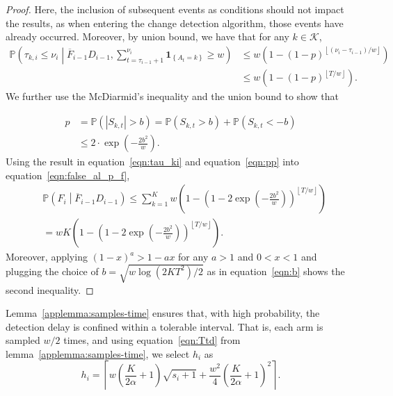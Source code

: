\documentclass[twoside]{article}
\def\eqref#1{equation~\ref{#1}}
\def\1{\bm{1}}
\def\gK{{\mathcal{K}}}
\theoremstyle{plain}
\theoremstyle{definition}
\theoremstyle{remark}
\begin{document}
\begin{proof}
    Here, the inclusion of subsequent events as conditions should not impact the results, as when entering the change detection algorithm, those events have already occurred.
    Moreover, by union bound, we have that for any $k\in\gK$,
    \begin{subequations}
        \begin{align}
            \mathbb{P}\left(\tau_{k,i}\leq \nu_{i}\middle|\overline{F}_{i-1}D_{i-1},\sum_{t=\tau_{i-1}+1}^{\nu_{i}}\1_{\left\{A_{t}=k\right\}}\geq w\right)&\leq w\left( 1-\left(1-p\right)^{\left\lfloor \left(\nu_{i}-\tau_{i-1}\right)/w \right\rfloor}  \right)\\ 
            &\leq w\left( 1-(1-p)^{\left\lfloor T/w \right\rfloor}  \right).  \label{eqn:tau_ki}
        \end{align}
    \end{subequations}
    We further use the McDiarmid's inequality and the union bound to show that

    \begin{subequations}
        \begin{align}
            p&=\mathbb{P}\left(\left\lvert S_{k,t} \right\rvert>b\right)=\mathbb{P}\left(S_{k,t}>b\right)+\mathbb{P}\left(S_{k,t}<-b\right)\\
            &\leq 2\cdot \exp\left(-\frac{2b^{2}}{w}\right). \label{eqn:pp}
        \end{align}
    \end{subequations}
    Using the result in \eqref{eqn:tau_ki} and \eqref{eqn:pp} into \eqref{eqn:false_al_p_f}, 
    \begin{subequations}
        \begin{align}
            &\mathbb{P}\left(F_{i}\middle|\overline{F}_{i-1}D_{i-1}\right)\leq \sum^{K}_{k=1}w\left( 1-\left(1-2 \exp\left(-\frac{2b^{2}}{w}\right)\right)^{\left\lfloor T/w \right\rfloor}  \right) \\
            &= wK\left( 1-\left(1-2 \exp\left(-\frac{2b^{2}}{w}\right)\right)^{\left\lfloor T/w \right\rfloor}  \right).
        \end{align}
    \end{subequations}
    Moreover, applying $\left(1-x\right)^{a}>1-ax$ for any $a>1$ and $0<x<1$ and plugging the choice of $b = \sqrt{w\log\left(2KT^{2} \right)/2}$ as in \eqref{eqn:b} shows the second inequality.
\end{proof}

Lemma~\ref{applemma:samples-time} ensures that, with high probability, the detection delay is confined within a tolerable interval. 
That is, each arm is sampled \(w/2\) times, and using equation~\ref{eqn:Ttd} from lemma~\ref{applemma:samples-time}, we select \(h_{i}\) as
\begin{equation}
h_{i} = \left\lceil w\left(\frac{K}{2\alpha}+1\right)\sqrt{s_{i}+1}+\frac{w^{2}}{4}\left(\frac{K}{2\alpha}+1\right)^{2} \right\rceil.
\end{equation}
\end{document}
